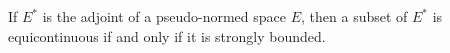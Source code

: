 If $E^*$ is the adjoint of a pseudo-normed space $E$, then a subset of $E^*$ is equicontinuous if and only if it is strongly bounded.

